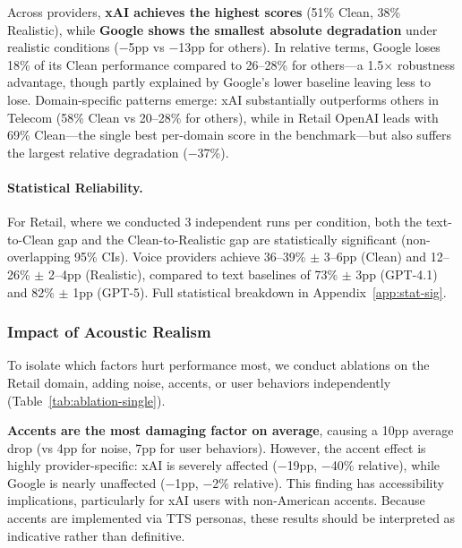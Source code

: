 Across providers, \textbf{xAI achieves the highest scores} (51\% Clean, 38\% Realistic), while \textbf{Google shows the smallest absolute degradation} under realistic conditions ($-$5pp vs $-$13pp for others). In relative terms, Google loses 18\% of its Clean performance compared to 26--28\% for others---a 1.5$\times$ robustness advantage, though partly explained by Google's lower baseline leaving less to lose. Domain-specific patterns emerge: xAI substantially outperforms others in Telecom (58\% Clean vs 20--28\% for others), while in Retail OpenAI leads with 69\% Clean---the single best per-domain score in the benchmark---but also suffers the largest relative degradation ($-$37\%).

\paragraph{Statistical Reliability.} For Retail, where we conducted 3 independent runs per condition, both the text-to-Clean gap and the Clean-to-Realistic gap are statistically significant (non-overlapping 95\% CIs). Voice providers achieve 36--39\% $\pm$ 3--6pp (Clean) and 12--26\% $\pm$ 2--4pp (Realistic), compared to text baselines of 73\% $\pm$ 3pp (GPT-4.1) and 82\% $\pm$ 1pp (GPT-5). Full statistical breakdown in Appendix~\ref{app:stat-sig}.

\subsubsection{Impact of Acoustic Realism}

To isolate which factors hurt performance most, we conduct ablations on the Retail domain, adding noise, accents, or user behaviors independently (Table~\ref{tab:ablation-single}).



\textbf{Accents are the most damaging factor on average}, causing a 10pp average drop (vs 4pp for noise, 7pp for user behaviors). However, the accent effect is highly provider-specific: xAI is severely affected ($-$19pp, $-$40\% relative), while Google is nearly unaffected ($-$1pp, $-$2\% relative). This finding has accessibility implications, particularly for xAI users with non-American accents. Because accents are implemented via TTS personas, these results should be interpreted as indicative rather than definitive.

